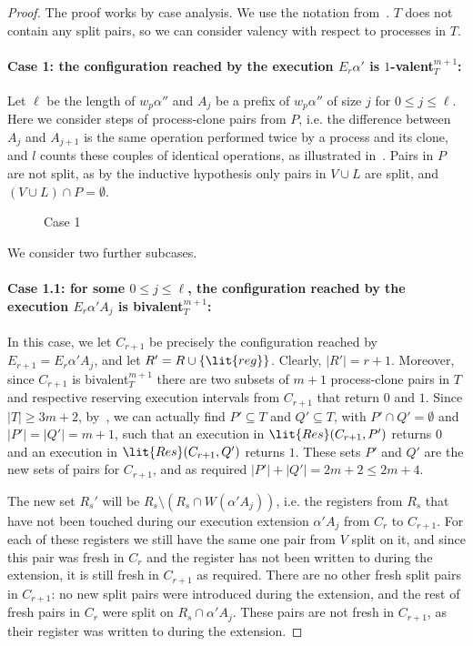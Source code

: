 \begin{proof}
The proof works by case analysis. We use the notation from~.
$T$ does not contain any split pairs, so we can consider valency with respect to processes in $T$.  

\paragraph{Case 1: the configuration reached by the execution $E_r \alpha'$ is $1$-valent$_T^{m+1}$:}
Let $\ell$ be the length of $w_p \alpha''$ and $A_j$ be a prefix of $w_p \alpha''$ of size $j$ for $0 \leq j \leq \ell$.
Here we consider steps of process-clone pairs from $P$, 
  i.e. the difference between $A_j$ and $A_{j+1}$ is the same operation performed twice by a process and its clone,
  and $l$ counts these couples of identical operations,
  as illustrated in~.
Pairs in $P$ are not split, as by the inductive hypothesis only pairs in $V \cup L$ are split, 
  and $(V \cup L) \cap P = \emptyset$.

\begin{figure}
\label{fig:case1}
\caption{Case 1}
\end{figure}

We consider two further subcases.

\paragraph{Case 1.1: for some $0 \leq j \leq \ell$, 
  the configuration reached by the execution $E_r \alpha' A_j$ is bivalent$_T^{m+1}$:}
In this case, we let $C_{r+1}$ be precisely the configuration reached by $E_{r+1} = E_r \alpha' A_j$, 
  and let $R' = R \cup \{\lit{reg}\}$.
Clearly, $|R'| = r+1$.
Moreover, since $C_{r+1}$ is bivalent$_T^{m+1}$ there are two subsets of $m+1$ process-clone pairs in $T$ 
  and respective reserving execution intervals from $C_{r+1}$ that return $0$ and $1$.
Since $|T| \geq 3m+2$, by~, we can actually find $P' \subseteq T$ and $Q' \subseteq T$, 
  with $P' \cap Q' = \emptyset$ and $|P'| = |Q'| = m+1$, such that
  an execution in $\lit{Res}(C_{r+1}, P')$ returns $0$ and an execution in $\lit{Res}(C_{r+1}, Q')$ returns $1$.
These sets $P'$ and $Q'$ are the new sets of pairs for $C_{r+1}$, and as required $|P'| + |Q'| = 2m+2 \leq 2m+4$.

The new set $R_s'$ will be $R_s \setminus (R_s \cap W(\alpha' A_j))$, i.e. the registers from $R_s$ 
  that have not been touched during our execution extension $\alpha' A_j$ from $C_r$ to $C_{r+1}$.
For each of these registers we still have the same one pair from $V$ split on it, 
  and since this pair was fresh in $C_r$ and the register has not been written to during the extension,
  it is still fresh in $C_{r+1}$ as required.  
There are no other fresh split pairs in $C_{r+1}$:
  no new split pairs were introduced during the extension,
  and the rest of fresh pairs in $C_r$ were split on $R_s \cap \alpha' A_j$.
These pairs are not fresh in $C_{r+1}$, as their register was written to during the extension.


\end{proof}

